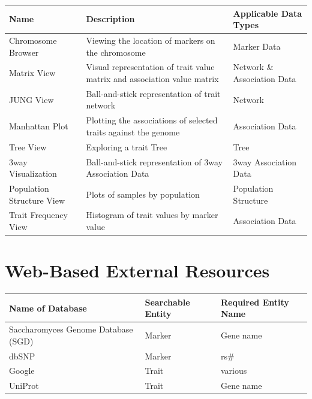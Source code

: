 \documentclass{article}
\begin{document}
\begin{appendices}
\begin{longtable}{p{4cm}p{6cm}p{4cm}}
\hline Name & Description & Applicable Data Types\\  \hline
Chromosome Browser & Viewing the location of markers on the chromosome&Marker Data\\  \hline
Matrix View & Visual representation of trait value matrix and association value matrix&Network \& Association Data\\  \hline
JUNG View & Ball-and-stick representation of trait network & Network \\  \hline
Manhattan Plot & Plotting the associations of selected traits against the genome & Association Data \\  \hline
Tree View & Exploring a trait Tree & Tree\\  \hline
3way Visualization & Ball-and-stick representation of 3way Association Data & 3way Association Data\\  \hline
Population Structure View & Plots of samples by population & Population Structure\\  \hline
Trait Frequency View & Histogram of trait values by marker value & Association Data\\  \hline
\end{longtable}

\section{Web-Based External Resources} \label{resources}

\begin{longtable}{p{4cm}p{4cm}p{4cm}}
\hline Name of Database&Searchable Entity&Required Entity Name \\  \hline

\endhead

Saccharomyces Genome Database (SGD) & Marker & Gene name \\ \hline
dbSNP & Marker & rs\# \\ \hline
Google & Trait & various \\ \hline
UniProt & Trait & Gene name \\ \hline

\end{longtable}




\end{appendices}
\end{document}

